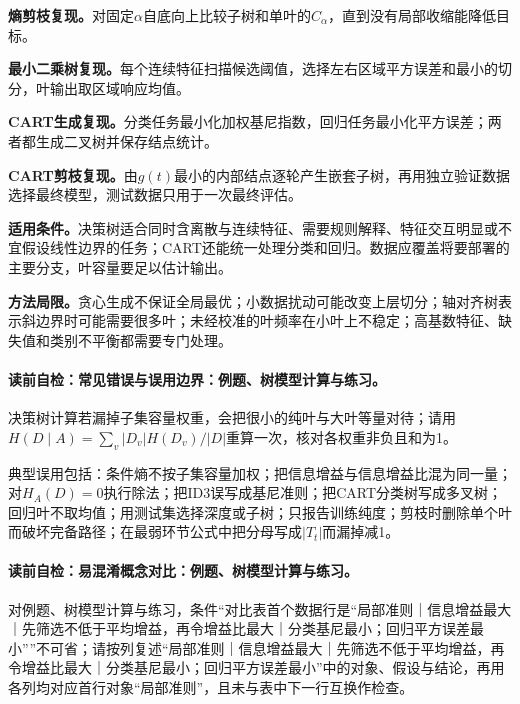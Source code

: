 \label{replay:V2-C04-S07-SLM-05-04-002}
\textbf{熵剪枝复现。}对固定$\alpha$自底向上比较子树和单叶的$C_\alpha$，直到没有局部收缩能降低目标。

\label{replay:V2-C04-S07-SLM-05-05-003}
\textbf{最小二乘树复现。}每个连续特征扫描候选阈值，选择左右区域平方误差和最小的切分，叶输出取区域响应均值。

\label{replay:V2-C04-S07-SLM-05-06-001}
\textbf{CART生成复现。}分类任务最小化加权基尼指数，回归任务最小化平方误差；两者都生成二叉树并保存结点统计。

\label{replay:V2-C04-S07-SLM-05-07-001}
\textbf{CART剪枝复现。}由$g(t)$最小的内部结点逐轮产生嵌套子树，再用独立验证数据选择最终模型，测试数据只用于一次最终评估。

\label{struct:V2-C04-CH28}
\label{struct:V2-C04-CH29}
\begin{applicabilitybox}
\textbf{适用条件。}决策树适合同时含离散与连续特征、需要规则解释、特征交互明显或不宜假设线性边界的任务；CART还能统一处理分类和回归。数据应覆盖将要部署的主要分支，叶容量要足以估计输出。

\textbf{方法局限。}贪心生成不保证全局最优；小数据扰动可能改变上层切分；轴对齐树表示斜边界时可能需要很多叶；未经校准的叶频率在小叶上不稳定；高基数特征、缺失值和类别不平衡都需要专门处理。
\end{applicabilitybox}

\label{struct:V2-C04-CH30}
\paragraph{读前自检：常见错误与误用边界：例题、树模型计算与练习。}决策树计算若漏掉子集容量权重，会把很小的纯叶与大叶等量对待；请用$H(D\mid A)=\sum_v |D_v|H(D_v)/|D|$重算一次，核对各权重非负且和为1。\par

\begin{warningbox}
典型误用包括：条件熵不按子集容量加权；把信息增益与信息增益比混为同一量；对$H_A(D)=0$执行除法；把ID3误写成基尼准则；把CART分类树写成多叉树；回归叶不取均值；用测试集选择深度或子树；只报告训练纯度；剪枝时删除单个叶而破坏完备路径；在最弱环节公式中把分母写成$|T_t|$而漏掉减1。
\end{warningbox}

\label{struct:V2-C04-CH31}
\paragraph{读前自检：易混淆概念对比：例题、树模型计算与练习。}对例题、树模型计算与练习，条件“对比表首个数据行是“局部准则｜信息增益最大｜先筛选不低于平均增益，再令增益比最大｜分类基尼最小；回归平方误差最小””不可省；请按列复述“局部准则｜信息增益最大｜先筛选不低于平均增益，再令增益比最大｜分类基尼最小；回归平方误差最小”中的对象、假设与结论，再用各列均对应首行对象“局部准则”，且未与表中下一行互换作检查。\par

